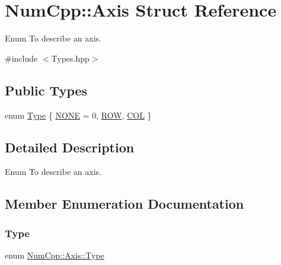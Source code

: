 \hypertarget{struct_num_cpp_1_1_axis}{}\section{Num\+Cpp\+:\+:Axis Struct Reference}
\label{struct_num_cpp_1_1_axis}


Enum To describe an axis.  




{\ttfamily \#include $<$Types.\+hpp$>$}

\subsection*{Public Types}
\begin{DoxyCompactItemize}
\item 
enum \mbox{\hyperlink{struct_num_cpp_1_1_axis_ac10eb76f8631762d9ed70c40c42ca6cb}{Type}} \{ \mbox{\hyperlink{struct_num_cpp_1_1_axis_ac10eb76f8631762d9ed70c40c42ca6cba747ae657022cca1d87702b56d0c038e9}{N\+O\+NE}} = 0, 
\mbox{\hyperlink{struct_num_cpp_1_1_axis_ac10eb76f8631762d9ed70c40c42ca6cbad9f2ab1396aad2412d9c77fbcbbe6aca}{R\+OW}}, 
\mbox{\hyperlink{struct_num_cpp_1_1_axis_ac10eb76f8631762d9ed70c40c42ca6cba3ac76bd6bb346c0846239e37314d905a}{C\+OL}}
 \}
\end{DoxyCompactItemize}


\subsection{Detailed Description}
Enum To describe an axis. 

\subsection{Member Enumeration Documentation}
\mbox{\label{struct_num_cpp_1_1_axis_ac10eb76f8631762d9ed70c40c42ca6cb}} 
\subsubsection{\texorpdfstring{Type}{Type}}
{\footnotesize\ttfamily enum \mbox{\hyperlink{struct_num_cpp_1_1_axis_ac10eb76f8631762d9ed70c40c42ca6cb}{Num\+Cpp\+::\+Axis\+::\+Type}}}

